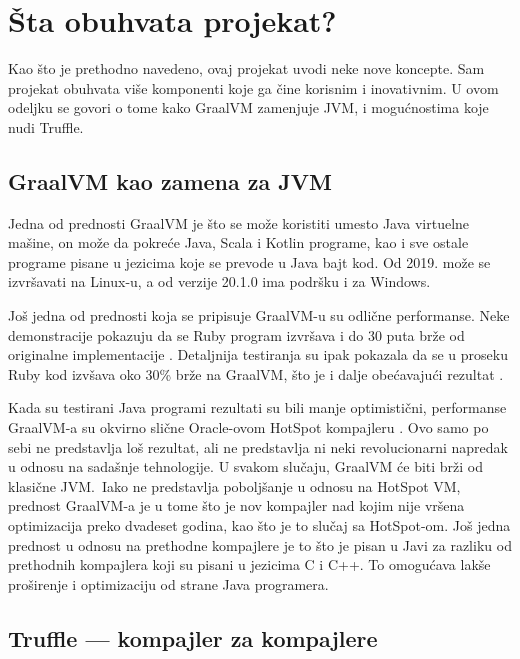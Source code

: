 \documentclass[a4paper]{article}
\begin{document}
\section{Šta obuhvata projekat?}
\label{sec:projekat}

Kao što je prethodno navedeno, ovaj projekat uvodi neke nove koncepte. Sam projekat obuhvata više komponenti koje ga čine korisnim i inovativnim. U ovom odeljku se govori o tome kako GraalVM zamenjuje JVM, i mogućnostima koje nudi Truffle.

\subsection{GraalVM kao zamena za JVM}
\label{sub:GraalVMJVM}

Jedna od prednosti GraalVM je što se može koristiti umesto Java virtuelne mašine, on može da pokreće Java, Scala i Kotlin programe, kao i sve ostale programe pisane u jezicima koje se prevode u Java bajt kod. Od 2019. može se izvršavati na Linux-u, a od verzije 20.1.0 ima podršku i za Windows.

Još jedna od prednosti koja se pripisuje GraalVM-u su odlične performanse. Neke demonstracije pokazuju da se Ruby program izvršava i do 30 puta brže od originalne implementacije \cite{graalvmbenchmark}. Detaljnija testiranja su ipak pokazala da se u proseku Ruby kod izvšava oko 30\% brže na GraalVM, što je i dalje obećavajući rezultat \cite{whataboutgraalvm}.

Kada su testirani Java programi rezultati su bili manje optimistični, performanse GraalVM-a su okvirno slične Oracle-ovom HotSpot kompajleru \cite{graalvm}. Ovo samo po sebi ne predstavlja loš rezultat, ali ne predstavlja ni neki revolucionarni napredak u odnosu na sadašnje tehnologije. U svakom slučaju, GraalVM će biti brži od klasične JVM.\ Iako ne predstavlja poboljšanje u odnosu na HotSpot VM, prednost GraalVM-a je u tome što je nov kompajler nad kojim nije vršena optimizacija preko dvadeset godina, kao što je to slučaj sa HotSpot-om. Još jedna prednost u odnosu na prethodne kompajlere je to što je pisan u Javi za razliku od prethodnih kompajlera koji su pisani u jezicima C i C++. To omogućava lakše proširenje i optimizaciju od strane Java programera.

\subsection{Truffle --- kompajler za kompajlere}
\label{sub:truffle}
\end{document}
